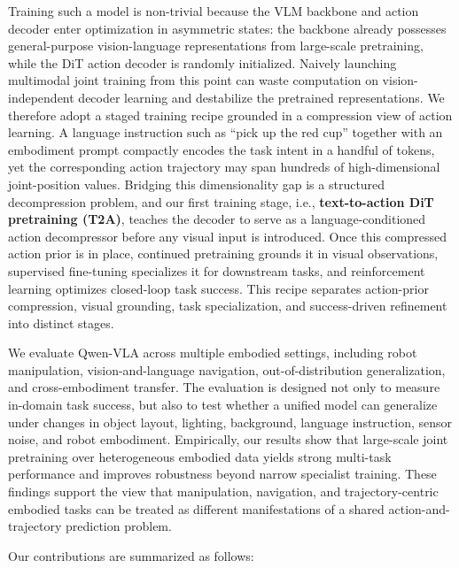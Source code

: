 \documentclass{llmxive}
\begin{document}
  

 
Training such a model is non-trivial because the VLM backbone and action decoder enter optimization in asymmetric states: the backbone already possesses general-purpose vision-language representations from large-scale pretraining, while the DiT action decoder is randomly initialized. Naively launching multimodal joint training from this point can waste computation on vision-independent decoder learning and destabilize the pretrained representations. We therefore adopt a staged training recipe grounded in a compression view of action learning. A language instruction such as ``pick up the red cup'' together with an embodiment prompt compactly encodes the task intent in a handful of tokens, yet the corresponding action trajectory may span hundreds of high-dimensional joint-position values. Bridging this dimensionality gap is a structured decompression problem, and our first training stage, i.e., \textbf{text-to-action DiT pretraining (T2A)}, teaches the decoder to serve as a language-conditioned action decompressor before any visual input is introduced. Once this compressed action prior is in place, continued pretraining grounds it in visual observations, supervised fine-tuning specializes it for downstream tasks, and reinforcement learning optimizes closed-loop task success. This recipe separates action-prior compression, visual grounding, task specialization, and success-driven refinement into distinct stages.



We evaluate Qwen-VLA across multiple embodied settings, including robot manipulation, vision-and-language navigation, out-of-distribution generalization, and cross-embodiment transfer. The evaluation is designed not only to measure in-domain task success, but also to test whether a unified model can generalize under changes in object layout, lighting, background, language instruction, sensor noise, and robot embodiment. Empirically, our results show that large-scale joint pretraining over heterogeneous embodied data yields strong multi-task performance and improves robustness beyond narrow specialist training. These findings support the view that manipulation, navigation, and trajectory-centric embodied tasks can be treated as different manifestations of a shared action-and-trajectory prediction problem.

Our contributions are summarized as follows:
\end{document}
